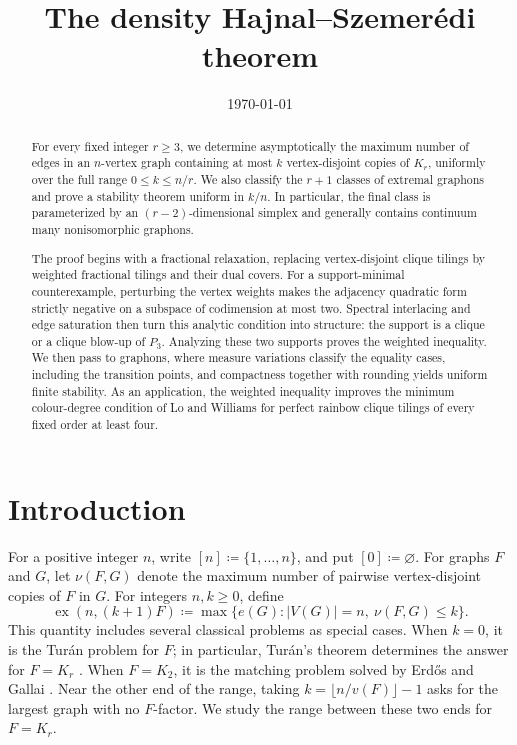 \documentclass[10pt]{article}
\title{\bf\Large The density Hajnal--Szemer\'edi theorem}
\author{}
\date{\today}
\numberwithin{equation}{section}
\newcommand{\ex}{\operatorname{ex}}
\begin{document}
\maketitle

\begin{abstract}
For every fixed integer $r\ge3$, we determine asymptotically the maximum number of edges in an $n$-vertex graph containing at most $k$ vertex-disjoint copies of $K_r$, uniformly over the full range $0\le k\le n/r$.  We also classify the $r+1$ classes of extremal graphons and prove a stability theorem uniform in $k/n$.  In particular, the final class is parameterized by an $(r-2)$-dimensional simplex and generally contains continuum many nonisomorphic graphons.

The proof begins with a fractional relaxation, replacing vertex-disjoint clique tilings by weighted fractional tilings and their dual covers.  For a support-minimal counterexample, perturbing the vertex weights makes the adjacency quadratic form strictly negative on a subspace of codimension at most two.  Spectral interlacing and edge saturation then turn this analytic condition into structure: the support is a clique or a clique blow-up of $P_3$.  Analyzing these two supports proves the weighted inequality.  We then pass to graphons, where measure variations classify the equality cases, including the transition points, and compactness together with rounding yields uniform finite stability.  As an application, the weighted inequality improves the minimum colour-degree condition of Lo and Williams for perfect rainbow clique tilings of every fixed order at least four.
\end{abstract}

\tableofcontents

\section{Introduction}\label{sec:introduction}

For a positive integer $n$, write $[n]\coloneqq\{1,\ldots,n\}$, and put $[0]\coloneqq\varnothing$.  For graphs $F$ and $G$, let $\nu(F,G)$ denote the maximum number of pairwise vertex-disjoint copies of $F$ in $G$.  For integers $n,k\ge0$, define
\[
 \ex(n,(k+1)F)
 \coloneqq
 \max\{e(G)\colon |V(G)|=n,\ \nu(F,G)\le k\}.
\]
This quantity includes several classical problems as special cases.  When $k=0$, it is the Tur\'an problem for $F$; in particular, Tur\'an's theorem determines the answer for $F=K_r$ \cite{Turan41}.  When $F=K_2$, it is the matching problem solved by Erd\H{o}s and Gallai \cite{EG59}.  Near the other end of the range, taking $k=\lfloor n/v(F)\rfloor-1$ asks for the largest graph with no $F$-factor.  We study the range between these two ends for $F=K_r$.
\end{document}
